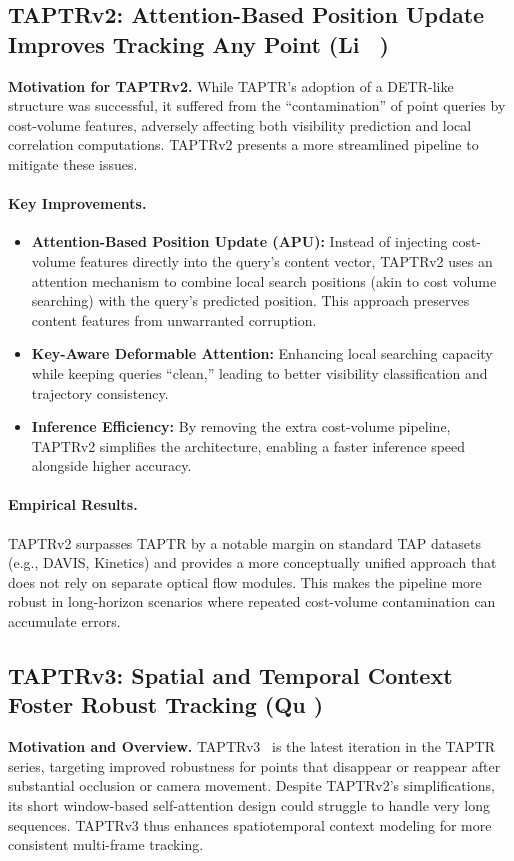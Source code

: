 \documentclass[11pt]{article}
\begin{document}
\subsection{TAPTRv2: Attention-Based Position Update Improves Tracking Any Point (Li \etal~\cite{li2024taptrv2})}
\textbf{Motivation for TAPTRv2.}
While TAPTR’s adoption of a DETR-like structure was successful, it suffered from the “contamination” of point queries by cost-volume features, adversely affecting both visibility prediction and local correlation computations. TAPTRv2 presents a more streamlined pipeline to mitigate these issues.

\paragraph{Key Improvements.}
\begin{itemize}
\item \textbf{Attention-Based Position Update (APU):} Instead of injecting cost-volume features directly into the query’s content vector, TAPTRv2 uses an attention mechanism to combine local search positions (akin to cost volume searching) with the query’s predicted position. This approach preserves content features from unwarranted corruption.
\item \textbf{Key-Aware Deformable Attention:} Enhancing local searching capacity while keeping queries “clean,” leading to better visibility classification and trajectory consistency.
\item \textbf{Inference Efficiency:} By removing the extra cost-volume pipeline, TAPTRv2 simplifies the architecture, enabling a faster inference speed alongside higher accuracy.
\end{itemize}

\paragraph{Empirical Results.}
TAPTRv2 surpasses TAPTR by a notable margin on standard TAP datasets (e.g., DAVIS, Kinetics) and provides a more conceptually unified approach that does not rely on separate optical flow modules. This makes the pipeline more robust in long-horizon scenarios where repeated cost-volume contamination can accumulate errors.

\subsection{TAPTRv3: Spatial and Temporal Context Foster Robust Tracking (Qu \etal)}
\textbf{Motivation and Overview.}
TAPTRv3~\cite{Qu2024taptrv3} is the latest iteration in the TAPTR series, targeting improved robustness for points that disappear or reappear after substantial occlusion or camera movement. Despite TAPTRv2’s simplifications, its short window-based self-attention design could struggle to handle very long sequences. TAPTRv3 thus enhances spatiotemporal context modeling for more consistent multi-frame tracking.
\end{document}
